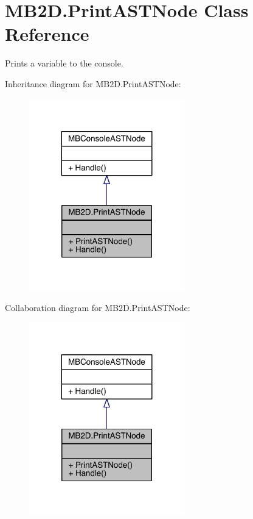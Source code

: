 \hypertarget{class_m_b2_d_1_1_print_a_s_t_node}{}\section{M\+B2\+D.\+Print\+A\+S\+T\+Node Class Reference}
\label{class_m_b2_d_1_1_print_a_s_t_node}


Prints a variable to the console.  




Inheritance diagram for M\+B2\+D.\+Print\+A\+S\+T\+Node\+:\nopagebreak
\begin{figure}[H]
\begin{center}
\leavevmode
\includegraphics[width=191pt]{class_m_b2_d_1_1_print_a_s_t_node__inherit__graph}
\end{center}
\end{figure}


Collaboration diagram for M\+B2\+D.\+Print\+A\+S\+T\+Node\+:\nopagebreak
\begin{figure}[H]
\begin{center}
\leavevmode
\includegraphics[width=191pt]{class_m_b2_d_1_1_print_a_s_t_node__coll__graph}
\end{center}
\end{figure}
